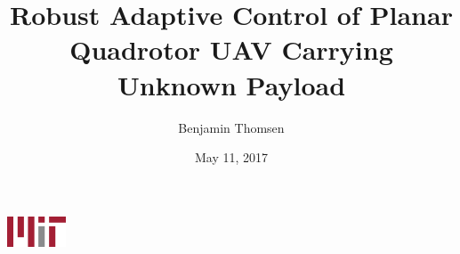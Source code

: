 \documentclass{beamer}
\title[]{Robust Adaptive Control of Planar Quadrotor UAV Carrying Unknown Payload}
\author[Benjamin Thomsen] {Benjamin Thomsen}
\institute[]{Department of Mechanical Engineering\\ Massachusetts Institute of Technology \\
}
\date[May 11, 2017]{May 11, 2017}
\begin{document}
{ 
\begin{frame}[noframenumbering]
\vspace{2cm}
\titlepage
\begin{center}
	\hspace{9cm}
	\includegraphics[height=0.9cm]{mit_logo}
\end{center}
\end{frame}
}

\end{document}
